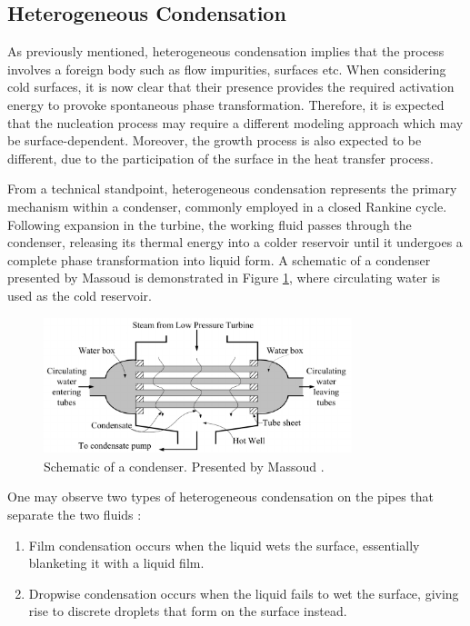 \documentclass[12pt]{article}
\numberwithin{equation}{section}
\begin{document}
\subsection{Heterogeneous Condensation}\label{ss:Literature-Heterogeneous}
As previously mentioned, heterogeneous condensation implies that the process involves a foreign body such as flow impurities, surfaces etc. When considering cold surfaces, it is now clear that their presence provides the required activation energy to provoke spontaneous phase transformation. Therefore, it is expected that the nucleation process may require a different modeling approach which may be surface-dependent. Moreover, the growth process is also expected to be different, due to the participation of the surface in the heat transfer process.

From a technical standpoint, heterogeneous condensation represents the primary mechanism within a condenser, commonly employed in a closed Rankine cycle. Following expansion in the turbine, the working fluid passes through the condenser, releasing its thermal energy into a colder reservoir until it undergoes a complete phase transformation into liquid form. A schematic of a condenser presented by Massoud \cite{massoud2005engineering} is demonstrated in Figure \ref{f:Condenser_schematic}, where circulating water is used as the cold reservoir.
\begin{figure}[H]
    \centering
    \includegraphics[width=0.8\textwidth]{Figures/Condenser_schematic.pdf}
    \caption{Schematic of a condenser. Presented by Massoud \cite{massoud2005engineering}.}
    \label{f:Condenser_schematic}
\end{figure}
One may observe two types of heterogeneous condensation on the pipes that separate the two fluids \cite{massoud2005engineering}:
\begin{enumerate}
    \item Film condensation occurs when the liquid wets the surface, essentially blanketing it with a liquid film.
    \item Dropwise condensation occurs when the liquid fails to wet the surface, giving rise to discrete droplets that form on the surface instead.
\end{enumerate}
\end{document}
